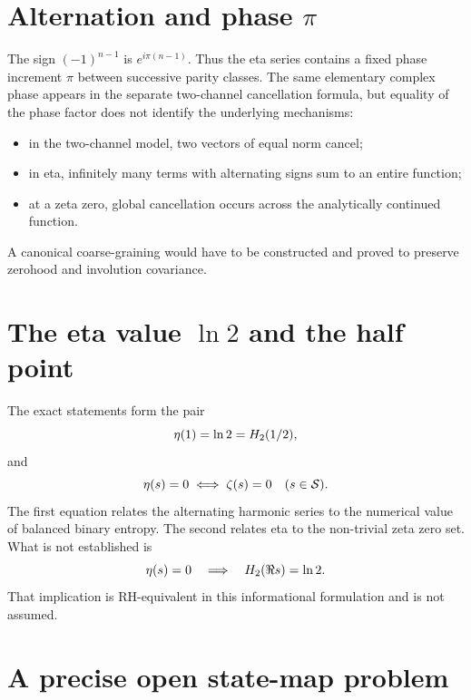 \section{Alternation and phase $\pi$}

The sign $(-1)^{n-1}$ is $e^{i\pi(n-1)}$. Thus the eta series contains a fixed phase increment $\pi$ between successive parity classes. The same elementary complex phase appears in the separate two-channel cancellation formula, but equality of the phase factor does not identify the underlying mechanisms:
\begin{itemize}
  \item in the two-channel model, two vectors of equal norm cancel;
  \item in eta, infinitely many terms with alternating signs sum to an entire function;
  \item at a zeta zero, global cancellation occurs across the analytically continued function.
\end{itemize}
A canonical coarse-graining would have to be constructed and proved to preserve zerohood and involution covariance.

\section{The eta value $\ln2$ and the half point}

The exact statements form the pair
\[
 \eta(1)=\ln2=H_2(1/2),
\]
and
\[
 \eta(s)=0\iff\zeta(s)=0\quad(s\in\mathcal{S}).
\]
The first equation relates the alternating harmonic series to the numerical value of balanced binary entropy. The second relates eta to the non-trivial zeta zero set. What is not established is
\[
 \eta(s)=0\quad\Longrightarrow\quad H_2(\Re s)=\ln2.
\]
That implication is RH-equivalent in this informational formulation and is not assumed.

\section{A precise open state-map problem}

